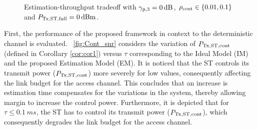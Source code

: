 \begin{figure}[!ht]
\vspace{-2mm}

\centering
{}
\caption{Estimation-throughput tradeoff with ${\gamma}_{\text{p,3}} = \SI{0}{dB}$, $\rho_{\text{cont}} \in \{0.01, 0.1\}$ and $P_{\text{Tx,ST,full}} = \SI{0}{dBm}$.}
\label{fig:ETT}
\end{figure}
First, the performance of the proposed framework in context to the deterministic channel is evaluated. \figurename~\ref{fig:Cont_snr} considers the variation of $P_{\text{Tx,ST,cont}}$ (defined in Corollary \ref{cor:cor1}) versus $\tau$ corresponding to the Ideal Model (IM) and the proposed Estimation Model (EM). It is noticed that the ST controls its transmit power ($P_{\text{Tx,ST,cont}}$) more severely for low values, consequently affecting the link budget for the access channel. This concludes that an increase is estimation time compensates for the variations in the system, thereby allowing margin to increase the control power. Furthermore, it is depicted that for $\tau \le \SI{0.1}{ms}$, the ST has to control its transmit power ($P_{\text{Tx,ST,cont}}$), which consequently degrades the link budget for the access channel. 
